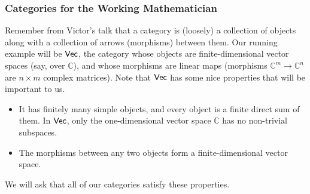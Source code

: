 \documentclass{beamer}
\newcommand{\textcat}[1]{\textup{\textsf{#1}}}
\begin{document}
\begin{frame}
\frametitle{Categories for the Working Mathematician}
Remember from Victor's talk that a category is (loosely) a collection of objects along with a collection of arrows (morphisms) between them.
\newline\newline
Our running example will be \textcolor{structure}{$\textcat{Vec}$}, the category whose objects are \textcolor{structure}{finite-dimensional} vector spaces (say, over $\mathbb{C}$), and whose morphisms are linear maps (morphisms $\mathbb{C}^m \to \mathbb{C}^n$ are $n \times m$ complex matrices).
\newline\newline
Note that $\textcat{Vec}$ has some nice properties that will be important to us.
\begin{itemize}
	\item It has finitely many simple objects, and every object is a finite direct sum of them. In $\textcat{Vec}$, only the one-dimensional vector space $\mathbb{C}$ has no non-trivial subspaces.
	\item The morphisms between any two objects form a finite-dimensional vector space.
\end{itemize}
We will ask that all of our categories satisfy these properties.
\end{frame}
\end{document}
